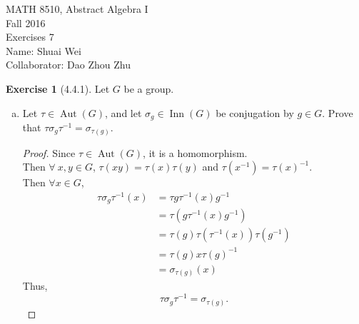 \documentclass{amsart}
\theoremstyle{plain}
\theoremstyle{definition}
\newtheorem{exer}[lem]{Exercise}
\begin{document}
\noindent MATH 8510, Abstract Algebra I \\
Fall 2016\\
Exercises 7\\
Name: Shuai Wei\\
Collaborator: Dao Zhou Zhu
\

%
%

\begin{exer}[4.4.1]
Let $G$ be a group.
\begin{enumerate}[(a)]
\item Let $\tau\in\operatorname{Aut}(G)$, and let $\sigma_g\in\operatorname{Inn}(G)$ be conjugation by $g\in G$.
Prove that $\tau\sigma_g\tau^{-1}=\sigma_{\tau(g)}$.
\begin{proof}
	Since $\tau \in \operatorname{Aut}(G)$, it is a homomorphism. \\
	Then $\forall \ x,y \in G$, $\tau(xy) = \tau(x)\tau(y)$ and $\tau(x^{-1}) = \tau(x)^{-1}$.\\
	Then $\forall x \in G$,
	\begin{align*}
	  \tau\sigma_g\tau^{-1}(x)&= \tau g\tau^{-1}(x)g^{-1}\\
	  						  &=\tau(g\tau^{-1}(x)g^{-1})\\
	  						  &=\tau(g)\tau\left(\tau^{-1}(x)\right)\tau\left(g^{-1}\right)\\
	  						  &=\tau(g)x\tau(g)^{-1}\\
	  						  &=\sigma_{\tau(g)}(x)
  \end{align*}
  Thus, 
  \[\tau\sigma_g\tau^{-1} = \sigma_{\tau(g)}.\]
\end{proof}


\end{enumerate}
\end{exer}
\end{document}
